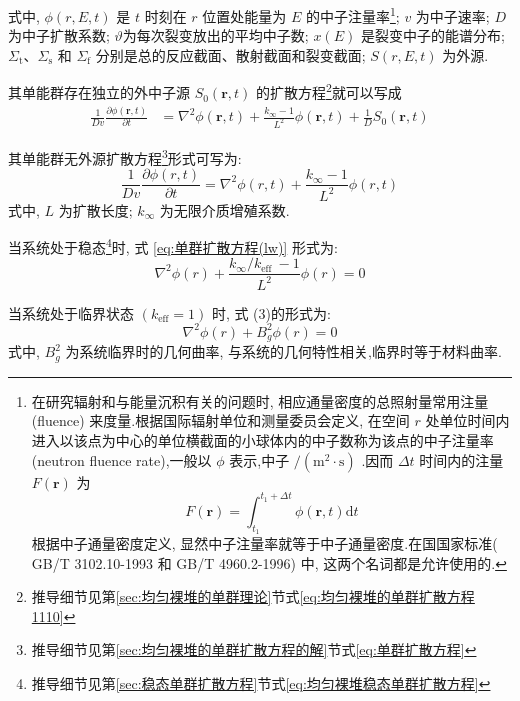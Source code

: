 \documentclass{Sichuan Normal University}
\begin{document}
式中, $\phi(r, E, t)$ 是 $t$ 时刻在 $r$ 位置处能量为 $E$ 的中子注量率\footnote{在研究辐射和与能量沉积有关的问题时, 相应通量密度的总照射量常用注量 (fluence) 来度量.根据国际辐射单位和测量委员会定义, 在空间 $r$ 处单位时间内进入以该点为中心的单位横截面的小球体内的中子数称为该点的中子注量率 (neutron fluence rate),一般以 $\phi$ 表示,中子 $/\left(\mathrm{m}^2 \cdot \mathrm{s}\right)$ .因而 $\Delta t$ 时间内的注量 $F(\boldsymbol{r})$ 为
$$
F(\boldsymbol{r})=\int_{t_1}^{t_1+\Delta t} \phi(\boldsymbol{r}, t) \mathrm{d} t
$$
根据中子通量密度定义, 显然中子注量率就等于中子通量密度.在国国家标准( GB/T 3102.10-1993 和 GB/T 4960.2-1996) 中, 这两个名词都是允许使用的.}; $v$ 为中子速率; $D$ 为中子扩散系数; $\vartheta$为每次裂变放出的平均中子数; $x(E)$ 是裂变中子的能谱分布; $\Sigma_{\mathrm{t}} 、 \Sigma_{\mathrm{s}}$ 和 $\Sigma_{\mathrm{f}}$ 分别是总的反应截面、散射截面和裂变截面; $S(r, E, t)$ 为外源.

其单能群存在独立的外中子源 $S_0(\boldsymbol{r}, t)$ 的扩散方程\footnote{推导细节见第\ref{sec:均匀裸堆的单群理论}节式\eqref{eq:均匀裸堆的单群扩散方程1110}}就可以写成
\begin{align}
\frac{1}{Dv} \frac{\partial \phi(\boldsymbol{r}, t)}{\partial t}&=\nabla^2 \phi(\boldsymbol{r}, t)+\frac{k_{\infty}-1}{L^2} \phi(\boldsymbol{r}, t)+\frac{1}{D}S_0(\boldsymbol{r}, t)
\label{eq:单群无外源扩散方程}
\end{align}

其单能群无外源扩散方程\footnote{推导细节见第\ref{sec:均匀裸堆的单群扩散方程的解}节式\eqref{eq:单群扩散方程}}形式可写为:
\begin{equation}
\frac{1}{D v} \frac{\partial \phi(r, t)}{\partial t}=\nabla^2 \phi(r, t)+\frac{k_{\infty}-1}{L^2} \phi(r, t)
\label{eq:单群扩散方程(lw)}
\end{equation}
式中, $L$ 为扩散长度; $k_{\infty}$ 为无限介质增殖系数.

当系统处于稳态\footnote{推导细节见第\ref{sec:稳态单群扩散方程}节式\eqref{eq:均匀裸堆稳态单群扩散方程}}时, 式 \eqref{eq:单群扩散方程(lw)} 形式为:
\begin{equation}
\nabla^2 \phi(r)+\frac{k_{\infty} / k_{\text {eff }}-1}{L^2} \phi(r)=0
\label{eq:均匀裸堆稳态单群扩散方程(lw)}
\end{equation}

当系统处于临界状态 $\left(k_{\mathrm{eff}}=1\right)$ 时, 式 (3)的形式为:
\begin{equation}
\nabla^2 \phi(r)+B_g^2 \phi(r)=0
\label{eq:均匀裸堆稳态单群扩散方程2(lw)}
\end{equation}
式中, $B_g^2$ 为系统临界时的几何曲率, 与系统的几何特性相关,临界时等于材料曲率.
\end{document}

